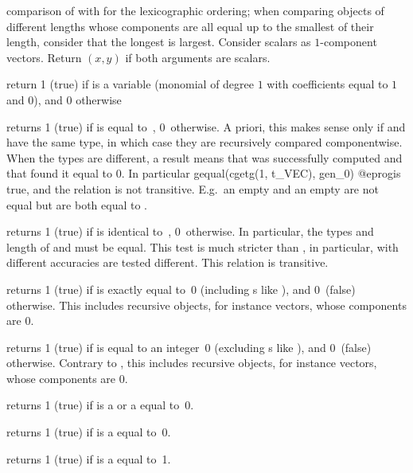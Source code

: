  comparison of  with  for the
lexicographic ordering; when comparing objects of different lengths whose
components are all equal up to the smallest of their length, consider that
the longest is largest. Consider scalars as $1$-component vectors. Return
$(x,y)$ if both arguments are scalars.

 return 1 (true) if  is a variable
(monomial of degree $1$ with  coefficients equal to $1$ and $0$),
and $0$ otherwise

 returns 1 (true) if  is equal
to~, 0~otherwise. A priori, this makes sense only if  and
 have the same type, in which case they are recursively compared
componentwise. When the types are different, a  result
means that  was successfully computed and that
 found it equal to $0$. In particular
\bprog
  gequal(cgetg(1, t_VEC), gen_0)
@eprog\noindent is true, and the relation is not transitive. E.g.~an empty
 and an empty  are not equal but are both equal to
.

 returns 1 (true) if  is identical
to~, 0~otherwise. In particular, the types and length of  and
 must be equal. This test is much stricter than , in
particular,  with different accuracies are tested different. This
relation is transitive.


 returns 1 (true) if  is exactly equal
to~0 (including s like ), and 0~(false) otherwise.
This includes recursive objects, for instance vectors, whose components are $0$.

 returns 1 (true) if  is equal
to an integer~0 (excluding s like ), and 0~(false)
otherwise. Contrary to , this includes recursive objects, for
instance vectors, whose components are $0$.

 returns 1 (true) if  is a  or
a  equal to~0.

 returns 1 (true) if  is a 
equal to~0.

 returns 1 (true) if  is a 
equal to~1.


